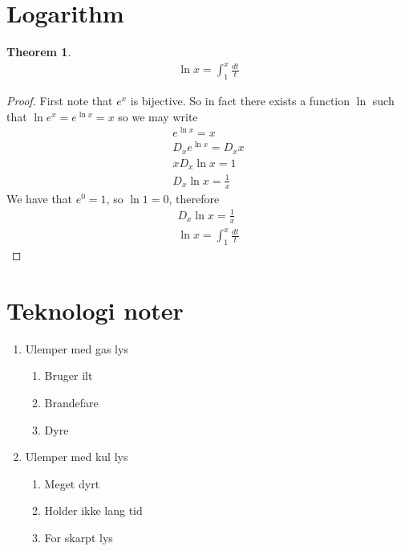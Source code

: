 \documentclass{article}
\newtheorem{theorem}{Theorem}[section]
\begin{document}
\section{Logarithm}
\begin{theorem}
	\begin{align*}
		\ln x = \int^x_1 \frac{dt}{t}
	\end{align*}
\end{theorem}
\begin{proof}
	First note that $e^x$ is bijective. So in fact there exists a function $\ln$
	such that $\ln e^x = e^{\ln x} = x$ so we may write
	\begin{align*}
		e^{\ln x} = x \\
		D_x e^{\ln x} = D_x x \\
		x D_x \ln x = 1 \\
		D_x \ln x = \frac{1}{x}
	\end{align*}
	We have that $e^0 = 1$, so $\ln 1 = 0$, therefore
	\begin{align*}
		D_x \ln x = \frac{1}{x} \\
		\ln x = \int^x_1 \frac{dt}{t}
	\end{align*}
\end{proof}
\newpage
\section{Teknologi noter}
\begin{enumerate}
	\item Ulemper med gas lys
	\begin{enumerate}
		\item Bruger ilt
		\item Brandefare
		\item Dyre
	\end{enumerate}
	\item Ulemper med kul lys
	\begin{enumerate}
		\item Meget dyrt
		\item Holder ikke lang tid
		\item For skarpt lys
	\end{enumerate}
\end{enumerate}
\end{document}

